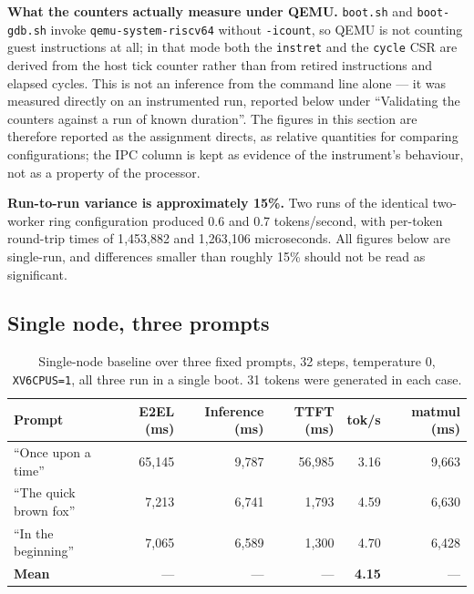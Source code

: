 \documentclass[11pt]{article}
\renewcommand{\_}{\origunderscore\allowbreak}
\begin{document}
\textbf{What the counters actually measure under QEMU.} \texttt{boot.sh} and \texttt{boot-gdb.sh} invoke \texttt{qemu-system-riscv64} without \texttt{-icount}, so QEMU is not counting guest instructions at all; in that mode both the \texttt{instret} and the \texttt{cycle} CSR are derived from the host tick counter rather than from retired instructions and elapsed cycles. This is not an inference from the command line alone --- it was measured directly on an instrumented run, reported below under ``Validating the counters against a run of known duration''. The figures in this section are therefore reported as the assignment directs, as relative quantities for comparing configurations; the IPC column is kept as evidence of the instrument's behaviour, not as a property of the processor.

\textbf{Run-to-run variance is approximately 15\%.} Two runs of the identical two-worker ring configuration produced 0.6 and 0.7 tokens/second, with per-token round-trip times of 1{,}453{,}882 and 1{,}263{,}106 microseconds. All figures below are single-run, and differences smaller than roughly 15\% should not be read as significant.

\subsection*{Single node, three prompts}

\begin{table}[H]
\centering
\small
\begin{tabular}{lrrrrr}
\toprule
\textbf{Prompt} & \textbf{E2EL (ms)} & \textbf{Inference (ms)} & \textbf{TTFT (ms)} & \textbf{tok/s} & \textbf{matmul (ms)} \\
\midrule
``Once upon a time''    & 65{,}145 & 9{,}787 & 56{,}985 & 3.16 & 9{,}663 \\
``The quick brown fox'' &  7{,}213 & 6{,}741 &  1{,}793 & 4.59 & 6{,}630 \\
``In the beginning''    &  7{,}065 & 6{,}589 &  1{,}300 & 4.70 & 6{,}428 \\
\midrule
\textbf{Mean}           & ---      & ---     & ---      & \textbf{4.15} & --- \\
\bottomrule
\end{tabular}
\caption{Single-node baseline over three fixed prompts, 32 steps, temperature 0, \texttt{XV6\_CPUS=1}, all three run in a single boot. 31 tokens were generated in each case.}
\label{tab:baseline-single}
\end{table}
\end{document}
